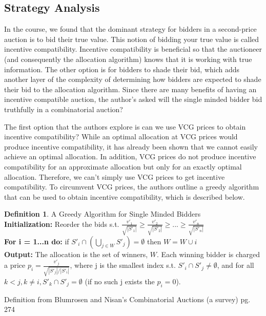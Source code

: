 \documentclass[10pt,onecolumn,letterpaper]{article}
\theoremstyle{definition}
\newtheorem{definition}{Definition}[section]
\begin{document}
\subsection{Strategy Analysis} %

In the course, we found that the dominant strategy for bidders in a second-price auction is to bid their true value. This notion of bidding your true value is called incentive compatibility. Incentive compatibility is beneficial so that the auctioneer (and consequently the allocation algorithm) knows that it is working with true information. The other option is for bidders to shade their bid, which adds another layer of the complexity of determining how bidders are expected to shade their bid to the allocation algorithm. Since there are many benefits of having an incentive compatible auction, the author's asked will the single minded bidder bid truthfully in a combinatorial auction?

The first option that the authors explore is can we use VCG prices to obtain incentive compatibility? While an optimal allocation at VCG prices would produce incentive compatibility, it has already been shown that we cannot easily achieve an optimal allocation. In addition, VCG prices do not produce incentive compatibility for an approximate allocation but only for an exactly optimal allocation. Therefore, we can't simply use VCG prices to get incentive compatibility. To circumvent VCG prices, the authors outline a greedy algorithm that can be used to obtain incentive compatibility, which is described below.
\clearpage
\theoremstyle{definition}
\begin{definition}{A Greedy Algorithm for Single Minded Bidders}
\\
\textbf{Initialization:} Reorder the bids s.t. $\frac{v'_1}{\sqrt{|S'_1|}} \geq \frac{v'_2}{\sqrt{|S'_2|}} \geq ... \geq \frac{v'_n}{\sqrt{|S'_n|}} $
\\
\textbf{For i = 1...n do:} if $S'_i \cap (\bigcup_{j \in W} S'_j) = \emptyset$ then $W = W \cup i$
\\
\textbf{Output:} The allocation is the set of winners, $W$. Each winning bidder is charged a price $p_i = \frac{v'_j}{\sqrt{|S'_j|/|S'_i|}}$, where j is the smallest index s.t. $S'_i \cap S'_j \neq \emptyset$, and for all $k < j, k \neq i, S'_k \cap S'_j = \emptyset$ (if no such j exists the $p_i = 0$).

Definition from Blumrosen and Nisan's Combinatorial Auctions (a survey) pg. 274 \cite{paper}
\end{definition}
\end{document}
